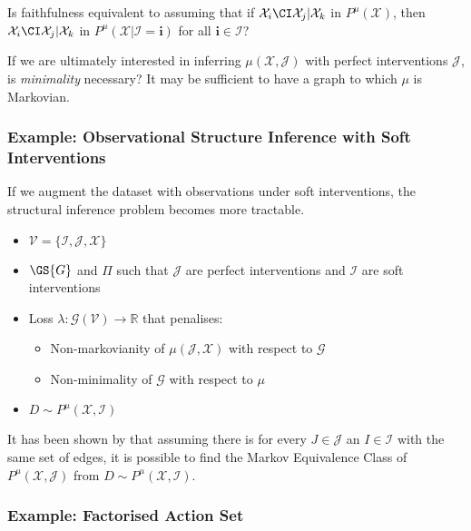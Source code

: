 \begin{remark}
Is faithfulness equivalent to assuming that if $\mathcal{X}_i\CI \mathcal{X}_j | \mathcal{X}_k$ in $P^\mu(\mathcal{X})$, then $\mathcal{X}_i\CI \mathcal{X}_j | \mathcal{X}_k$ in $P^\mu(\mathcal{X}|\mathcal{I}=\mathbf{i})$ for all $\mathbf{i}\in\mathcal{I}$? 
\end{remark}

\begin{remark}
If we are ultimately interested in inferring $\mu(\mathcal{X},\mathcal{J})$ with perfect interventions $\mathcal{J}$, is \emph{minimality} necessary? It may be sufficient to have a graph to which $\mu$ is Markovian.
\end{remark}

\subsubsection{Example: Observational Structure Inference with Soft Interventions}

If we augment the dataset with observations under soft interventions, the structural inference problem becomes more tractable.

\begin{itemize}
    \item $\mathcal{V}=\{\mathcal{I},\mathcal{J},\mathcal{X}\}$
    \item $\GS{G}$ and $\Pi$ such that $\mathcal{J}$ are perfect interventions and $\mathcal{I}$ are soft interventions
    \item Loss $\lambda:\mathscr{G}(\mathcal{V})\to\mathbb{R}$ that penalises:
    \begin{itemize}
        \item Non-markovianity of $\mu(\mathcal{J},\mathcal{X})$ with respect to $\mathcal{G}$
        \item Non-minimality of $\mathscr{G}$ with respect to $\mu$
    \end{itemize}
    \item $D\sim P^\mu(\mathcal{X},\mathcal{I})$
\end{itemize}

It has been shown by \cite{yang_characterizing_2018} that assuming there is for every $J\in \mathcal{J}$ an $I\in \mathcal{I}$ with the same set of edges, it is possible to find the Markov Equivalence Class of $P^\mu(\mathcal{X},\mathcal{J})$ from $D\sim P^\mu(\mathcal{X},\mathcal{I})$.


\subsubsection{Example: Factorised Action Set}

